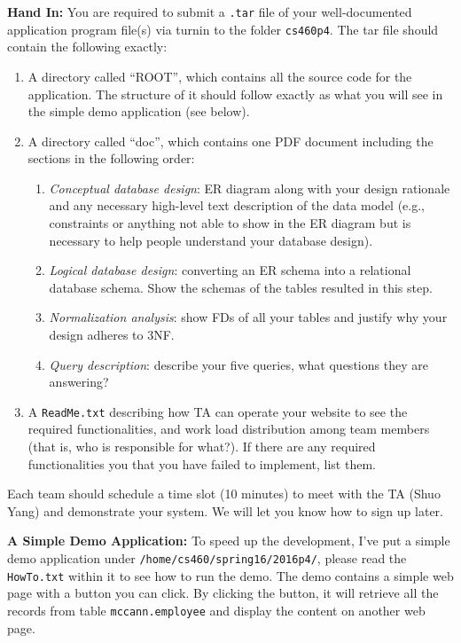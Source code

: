 \documentclass{article}
\begin{document}
\textbf{Hand In:}
You are required to submit a \texttt{.tar} file of your well-documented
application program file(s) via turnin to the folder
\texttt{cs460p4}. The tar file should contain the following exactly: 
\begin{enumerate}
\item A directory called ``ROOT'', which contains all the source code
  for the application. The structure of it should follow exactly as
  what you will see in the simple demo application (see below). 
\item A directory called ``doc'', which contains one PDF document
  including the sections in the following order:
  \begin{enumerate}
  \item
    \emph{Conceptual database design}: ER diagram along with your design
    rationale and any necessary high-level text description of
    the data model (e.g., constraints or anything not able to show in
    the ER diagram but is necessary to help people understand your
    database design).
  \item
    \emph{Logical database design}: converting an ER schema into a
    relational database schema. Show the schemas of the tables resulted
    in this step.
  \item
    \emph{Normalization analysis}: show FDs of all your tables and justify
    why your design adheres to 3NF.
  \item
    \emph{Query description}: describe your five queries, what
    questions they are answering?
  \end{enumerate}

\item A \texttt{ReadMe.txt} describing how TA can operate your
  website to see the required functionalities, and work load
  distribution among team members (that is, who is responsible for
  what?). If there are any required functionalities you that you have
  failed to implement, list them.
\end{enumerate}
Each team should schedule a time slot (10 minutes) to meet with the TA
(Shuo Yang) and demonstrate your system. We will let you know how to
sign up later.


\textbf{A Simple Demo Application:}
To speed up the development, I've put a simple demo application under
\texttt{/home/cs460/spring16/2016p4/}, please read the
\texttt{HowTo.txt} within it to see how to run the demo. The demo
contains a simple web page with a button you can click. By clicking the button, it
will retrieve all the records from table \texttt{mccann.employee} and
display the content on another web page.
\end{document}

